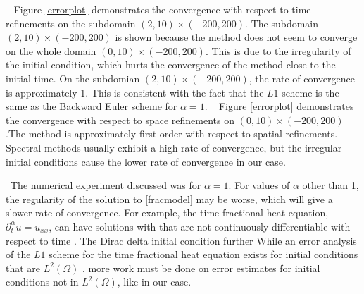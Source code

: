 \documentclass{siamart1116}
\newcommand{\LB}[1]{{\color{blue}~\textsf{#1}}}
\begin{document}
\LB{
Figure \ref{errorplot} demonstrates the convergence with respect to time refinements on the subdomain $(2,10)\times(-200,200)$. The subdomain $(2,10)\times(-200,200)$ is shown because the method does not seem to converge on the whole domain $(0,10)\times(-200,200)$. This is due to the irregularity of the initial condition, which hurts the convergence of the method close to the initial time. On the subdomian $(2,10)\times(-200,200)$, the rate of convergence is approximately 1. This is consistent with the fact that the $L1$ scheme is the same as the Backward Euler scheme for $\alpha = 1$.}
\LB{
Figure \ref{errorplot} demonstrates the convergence with respect to space refinements on $(0,10)\times(-200,200)$.The method is approximately first order with respect to spatial refinements. Spectral methods usually exhibit a high rate of convergence, but the irregular initial conditions cause the lower rate of convergence in our case.}

\LB{The numerical experiment discussed was for $\alpha=1$. For values of $\alpha$ other than 1, the regularity of the solution to \eqref{fracmodel} may be worse, which will give a slower rate of convergence. For example, the time fractional heat equation, $\partial^\alpha_tu = u_{xx}$, can have solutions with that are not continuously differentiable with respect to time \cite{stynes}. The Dirac delta initial condition further While an error analysis of the $L1$ scheme for the time fractional heat equation exists for initial conditions that are $L^2(\Omega)$ \cite{jin}, more work must be done on error estimates for initial conditions not in $L^2(\Omega)$, like in our case.}
\end{document}

